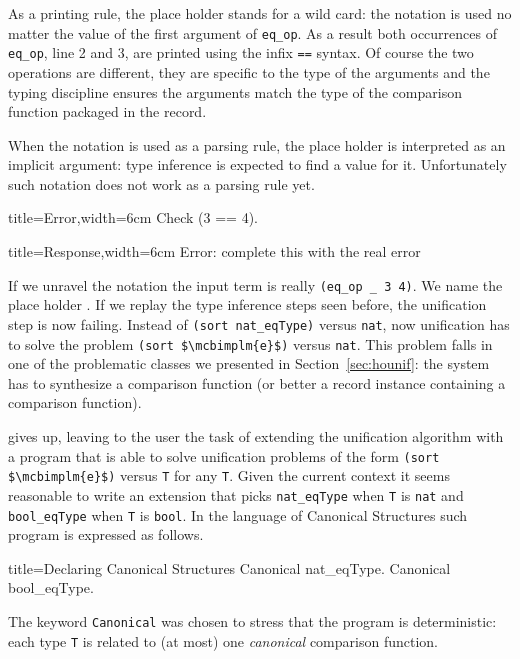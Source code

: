 As a printing rule, the place holder stands for a wild card: the
notation is used no matter the value of the first argument of
\lstinline/eq_op/.  As a result both occurrences of \lstinline/eq_op/,
line 2 and 3, are printed using the infix \lstinline/==/ syntax.
Of course the two operations are different, they are specific to the
type of the arguments and the typing discipline ensures the
arguments match the type of the comparison function packaged in
the record.

When the notation is used as a parsing rule, the place holder is
interpreted as an implicit argument: type inference is expected to find a value
for it.  Unfortunately such notation does not work as a parsing rule
yet.

\begin{coq}{title=Error,width=6cm}
Check (3 == 4).
$~$
\end{coq}
\begin{coqout}{title=Response,width=6cm}
Error: complete this
with the real error
\end{coqout}

If we unravel the notation the input term is really
\lstinline/(eq_op _ 3 4)/. We name the place holder .
If we replay the type inference steps seen before, the unification
step is now failing.  Instead of \lstinline/(sort nat_eqType)/
versus \lstinline/nat/, now unification has to solve the problem
\lstinline/(sort $\mcbimplm{e}$)/ versus \lstinline/nat/.
This problem falls in one of the problematic classes we presented in
Section~\ref{sec:hounif}: the system has to synthesize a comparison
function (or better a record instance containing a comparison
function).

\Coq{} gives up, leaving to the user the task of extending the
unification algorithm with a program that is able to solve
unification problems of the form \lstinline/(sort $\mcbimplm{e}$)/
versus \lstinline/T/ for any \lstinline/T/.
Given the current context it seems reasonable to write an
extension that picks \lstinline/nat_eqType/ when \lstinline/T/ is
\lstinline/nat/ and \lstinline/bool_eqType/ when \lstinline/T/ is
\lstinline/bool/.  In the language of Canonical Structures such
program is expressed as follows.

\begin{coq}{title=Declaring Canonical Structures}
Canonical nat_eqType.
Canonical bool_eqType.
\end{coq}

The keyword \lstinline/Canonical/ was chosen to stress that the
program is deterministic: each type  \lstinline/T/ is related to
(at most) one \emph{canonical} comparison function.

